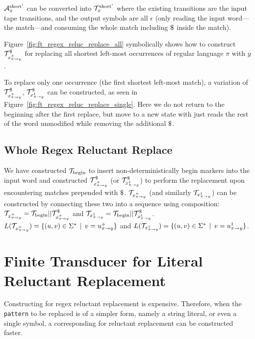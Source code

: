 $\mathcal{A}^{\text{short}'}_{\pi}$ can be converted into $\mathcal{T}^{\text{short}'}_{\pi}$ where the existing transitions are the input tape transitions, and the output symbols are all $\epsilon$ (\nft only reading the input word---the match---and consuming the whole match including $\marker$ inside the match).

Figure~\ref{fig:ft_regex_reluc_replace_all} symbolically shows how to construct $\mathcal{T}^\$_{x^{+}_{\pi \rightarrow y}}$ for replacing all shortest left-most occurrences of regular language $\pi$ with $y$.

To replace only one occurrence (the first shortest left-most match), a variation of $\mathcal{T}^\$_{x^{+}_{\pi \rightarrow y}}$, $\mathcal{T}^\$_{x^{1}_{\pi \rightarrow y}}$ can be constructed, as seen in Figure~\ref{fig:ft_regex_reluc_replace_single}.
Here we do not return to the beginning after the first replace, but move to a new state with just reads the rest of the word unmodified while removing the additional $\marker$.

\subsection{Whole Regex Reluctant Replace \nft}

We have constructed $\mathcal{T}_{\text{begin}}$ to insert non-deterministically begin markers into the input word and constructed $\mathcal{T}^\$_{x^{+}_{\pi \rightarrow y}}$ (or $\mathcal{T}^\$_{x^{1}_{\pi \rightarrow y}}$) to perform the replacement upon encountering matches prepended with $\marker$.
$\mathcal{T}_{x^{+}_{\pi \rightarrow y}}$ (and similarly $\mathcal{T}_{x^{1}_{\pi \rightarrow y}}$) can be constructed by connecting these two \nfts into a sequence using composition: $\mathcal{T}_{x^{+}_{\pi \rightarrow y}} = \mathcal{T}_{\text{begin}} || \mathcal{T}^\$_{x^{+}_{\pi \rightarrow y}}$ and $\mathcal{T}_{x^{1}_{\pi \rightarrow y}} = \mathcal{T}_{\text{begin}} || \mathcal{T}^\$_{x^{1}_{\pi \rightarrow y}}$.
$L(\mathcal{T}_{x^{+}_{\pi \rightarrow y}}) = \{ (u, v) \in \Sigma^* \,\mid\, v = u^{+}_{\pi \rightarrow y} \} $ and $L(\mathcal{T}_{x^{1}_{\pi \rightarrow y}}) = \{ (u, v) \in \Sigma^* \,\mid\, v = u^{1}_{\pi \rightarrow y} \} $.

\section{Finite Transducer for Literal Reluctant Replacement}

Constructing \nfts for regex reluctant replacement is expensive.
Therefore, when the \texttt{pattern} to be replaced is of a simpler form, namely a string literal, or even a single symbol, a corresponding \nft for reluctant replacement can be constructed faster.

